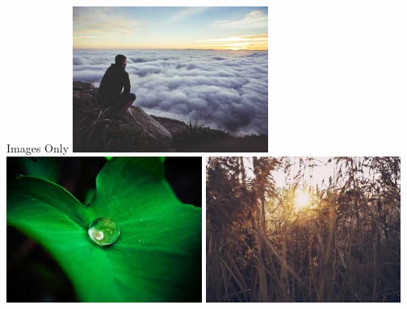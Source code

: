 \documentclass[aspectratio=169, notes]{beamer}
\begin{document}
{
    \newcommand{\imgheight}{0.35\textheight} %
    \begin{frame}{Images Only}
        \centering
        \includegraphics[width=0.48\textwidth, height=\imgheight, keepaspectratio]{Images/image1.jpg}
        \includegraphics[width=0.48\textwidth, height=\imgheight, keepaspectratio]{Images/image2.jpg}
        \includegraphics[width=0.48\textwidth, height=\imgheight, keepaspectratio]{Images/image3.jpg}
    \end{frame}
}
\end{document}

